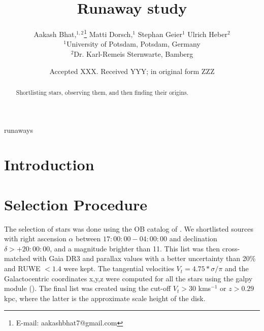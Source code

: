 \documentclass[fleqn,usenatbib]{mnras}
\title[Ondrejov]{Runaway study}
\author[Aakash Bhat et al.]{
Aakash Bhat,$^{1,2}$\thanks{E-mail: aakashbhat7@gmail.com}
Matti Dorsch,$^{1}$
Stephan Geier$^{1}$
Ulrich Heber$^{2}$
\\
$^{1}$University of Potsdam, Potsdam, Germany\\
$^{2}$Dr. Karl-Remeis Sternwarte, Bamberg
}
\date{Accepted XXX. Received YYY; in original form ZZZ}
\begin{document}
\label{firstpage}
\pagerange{\pageref{firstpage}--\pageref{lastpage}}
\maketitle

\begin{abstract}
Shortlisting stars, observing them, and then finding their origins.
\end{abstract}

\begin{keywords}
runaways
\end{keywords}



\section{Introduction}


\section{Selection Procedure}

The selection of stars was done using the OB catalog of \citet{2003AJ....125.2531R}. We shortlisted sources with right ascension $\alpha$ between $17:00:00-04:00:00$ and declination $\delta>+20:00:00$, and a magnitude brighter than 11. This list was then cross-matched with Gaia DR3 and parallax values with a better uncertainty than 20\% and RUWE $<1.4$ were kept. The tangential velocities $V_{t}=4.75*\sigma/\pi$ and the Galactocentric coordinates x,y,z were computed for all the stars using the galpy module (\cite{2015ApJS..216...29B}). The final list was created using the cut-off $V_{t}>30$ kms$^{-1}$ or $z>0.29$ kpc, where the latter is the approximate scale height of the disk.
\end{document}
